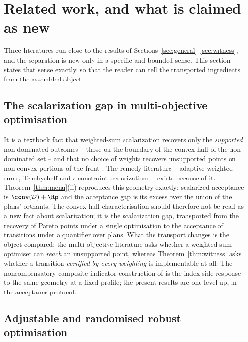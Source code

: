 \section{Related work, and what is claimed as new}\label{sec:related}

Three literatures run close to the results of Sections~\ref{sec:general}--\ref{sec:witness}, and the separation is new only in a specific and bounded sense. This section states that sense exactly, so that the reader can tell the transported ingredients from the assembled object.

\subsection{The scalarization gap in multi-objective optimisation}

It is a textbook fact that weighted-sum scalarization recovers only the \emph{supported} non-dominated outcomes -- those on the boundary of the convex hull of the non-dominated set -- and that no choice of weights recovers unsupported points on non-convex portions of the front \citep{Koski1985,AthanPapalambros1996,DasDennis1997,Miettinen1999,Ehrgott2005,MessacMattson2002}. The remedy literature -- adaptive weighted sums, Tchebycheff and $\epsilon$-constraint scalarizations -- exists because of it. Theorem~\ref{thm:menu}(ii) reproduces this geometry exactly: scalarized acceptance is $\conv(\mathcal D)+\Rp$ and the acceptance gap is its excess over the union of the plans' orthants. The convex-hull characterisation should therefore not be read as a new fact about scalarization; it is the scalarization gap, transported from the recovery of Pareto points under a single optimisation to the acceptance of transitions under a quantifier over plans. What the transport changes is the object compared: the multi-objective literature asks whether a weighted-sum optimiser can \emph{reach} an unsupported point, whereas Theorem~\ref{thm:witness} asks whether a transition \emph{certified by every weighting} is implementable at all. The noncompensatory composite-indicator construction of \citet{MundaNardo2009} is the index-side response to the same geometry at a fixed profile; the present results are one level up, in the acceptance protocol.

\subsection{Adjustable and randomised robust optimisation}

